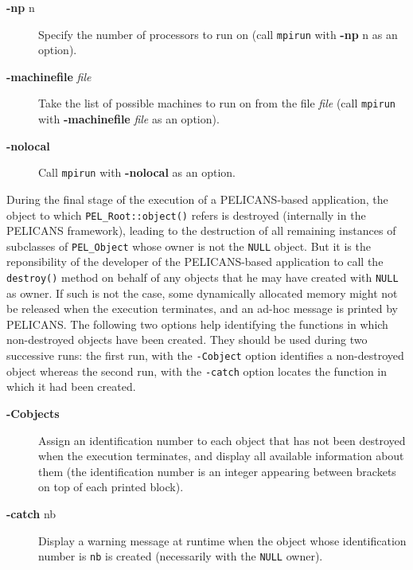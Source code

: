 \documentclass{article}
\begin{document}
\begin{description}

\item[\textbf{-np} n] \mbox{}

Specify the number of processors to run on
(call \texttt{mpirun} with \textbf{-np} n as an option).


\item[\textbf{-machinefile} \emph{file}] \mbox{}

Take the list of possible machines to run on from
the file \emph{file} (call \texttt{mpirun} with
\textbf{-machinefile} \emph{file} as an option).


\item[\textbf{-nolocal}] \mbox{}

Call \texttt{mpirun} with \textbf{-nolocal} as an option.

\end{description}


During the final stage of the execution of a PELICANS-based application,
the object to which \texttt{PEL\_Root::object()} refers is destroyed
(internally in the PELICANS framework), leading to
the destruction of all remaining instances of subclasses of \texttt{PEL\_Object}
whose owner is not the \texttt{NULL} object. But it is the reponsibility of
the developer of the PELICANS-based application to call the \texttt{destroy()}
method on behalf of any objects that he may have created with \texttt{NULL}
as owner. If such is not the case, some dynamically allocated memory
might not be released when the execution terminates, and an ad-hoc
message is printed by PELICANS. The following two options
help identifying the functions in which non-destroyed objects
have been created. They should be used during two successive runs:
the first run, with the \texttt{-Cobject} option identifies a non-destroyed
object whereas the second run, with the \texttt{-catch} option locates
the function in which it had been created.

\begin{description}

\item[\textbf{-Cobjects}] \mbox{}

Assign an identification number to each object that
has not been destroyed when the execution terminates,
and display all available information about them
(the identification number is an integer appearing
between brackets on top of each printed block).


\item[\textbf{-catch} nb] \mbox{}

Display a warning message at runtime when the
object whose identification number is \texttt{nb}
is created (necessarily with the \texttt{NULL} owner).

\end{description}
\end{document}
